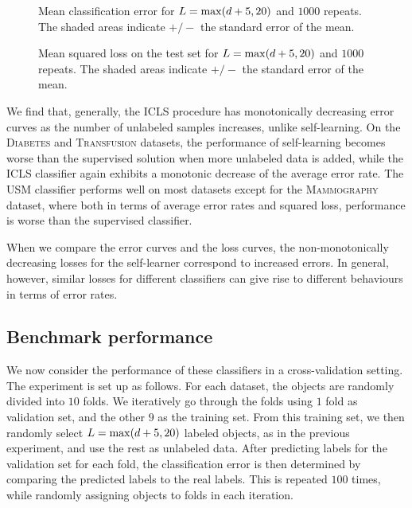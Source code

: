 \documentclass{elsarticle}
\begin{document}
\begin{figure}[t] 
  \centering
      \hspace*{-3.0cm}
      
  \caption{Mean classification error for $L=\max(d+5,20)$ and $1000$ repeats. The shaded areas indicate $+/-$ the standard error of the mean.} \label{fig:errorcurves}
\end{figure}

\begin{figure}[t] 
  \centering
      \hspace*{-3.0cm}
      
  \caption{Mean squared loss on the test set for $L=\max(d+5,20)$ and $1000$ repeats. The shaded areas indicate $+/-$ the standard error of the mean.} \label{fig:losscurves}
\end{figure}

We find that, generally, the ICLS procedure has monotonically decreasing error curves as the number of unlabeled samples increases, unlike self-learning. On the \textsc{Diabetes} and \textsc{Transfusion} datasets, the performance of self-learning becomes worse than the supervised solution when more unlabeled data is added, while the ICLS classifier again exhibits a monotonic decrease of the average error rate. The USM classifier performs well on most datasets except for the \textsc{Mammography} dataset, where both in terms of average error rates and squared loss, performance is worse than the supervised classifier.

When we compare the error curves and the loss curves, the non-monotonically decreasing losses for the self-learner correspond to increased errors. In general, however, similar losses for different classifiers can give rise to different behaviours in terms of error rates.

\subsection{Benchmark performance}
We now consider the performance of these classifiers in a cross-validation setting. The experiment is set up as follows. For each dataset, the objects are randomly divided into $10$ folds. We iteratively go through the folds using $1$ fold as validation set, and the other $9$ as the training set. From this training set, we then randomly select $L=\max(d+5,20)$ labeled objects, as in the previous experiment, and use the rest as unlabeled data. After predicting labels for the validation set for each fold, the classification error is then determined by comparing the predicted labels to the real labels. This is repeated $100$ times, while randomly assigning objects to folds in each iteration.
\end{document}
